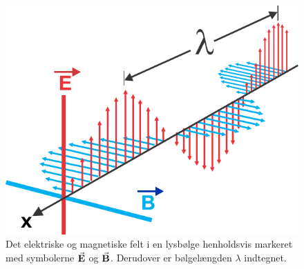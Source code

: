 \documentclass[crop=false, class=memoir]{standalone}
\begin{document}
\begin{figure}
    \centering
    \includegraphics[width=0.42\linewidth]{Laserfysik/billeder/EMBolge.pdf}
    \caption{Det elektriske og magnetiske felt i en lysbølge henholdsvis markeret med symbolerne $\va{E}$ og $\va{B}$. Derudover er bølgelængden $\lambda$ indtegnet.}
    \label{laser:fig:EMBolge}
\end{figure}
\end{document}
